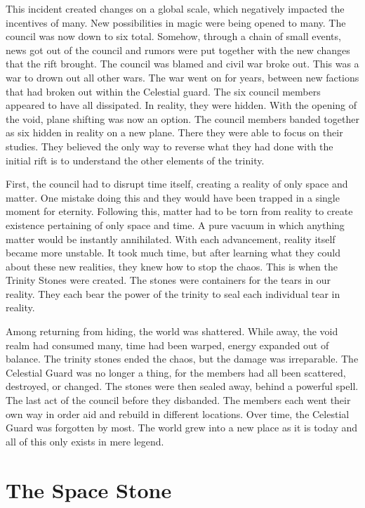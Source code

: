 This incident created changes on a global scale, which negatively impacted the incentives of many. New possibilities in magic were being opened to many. The council was now down to six total. Somehow, through a chain of small events, news got out of the council and rumors were put together with the new changes that the rift brought. The council was blamed and civil war broke out. This was a war to drown out all other wars. The war went on for years, between new factions that had broken out within the Celestial guard. The six council members appeared to have all dissipated. In reality, they were hidden. With the opening of the void, plane shifting was now an option. The council members banded together as six hidden in reality on a new plane. There they were able to focus on their studies. They believed the only way to reverse what they had done with the initial rift is to understand the other elements of the trinity. 

First, the council had to disrupt time itself, creating a reality of only space and matter. One mistake doing this and they would have been trapped in a single moment for eternity. Following this, matter had to be torn from reality to 
create existence pertaining of only space and time. A pure vacuum in which anything matter would be instantly annihilated. With each advancement, reality itself became more unstable. It took much time, but after learning what they could about these new realities, they knew how to stop the chaos. This is when the Trinity Stones were created. The stones were containers for the tears in our reality. They each bear the power of the trinity to seal each individual tear in reality.

Among returning from hiding, the world was shattered. While away, the void realm had consumed many, time had been warped, energy expanded out of balance. The trinity stones ended the chaos, but the damage was irreparable. The Celestial Guard was no longer a thing, for the members had all been scattered, destroyed, or changed. The stones were then sealed away, behind a powerful spell. The last act of the council before they disbanded. The members each went their own way in order aid and rebuild in different locations. Over time, the Celestial Guard was forgotten by most. The world grew into a new place as it is today and all of this only exists in mere legend.  

\section{The Space Stone}

